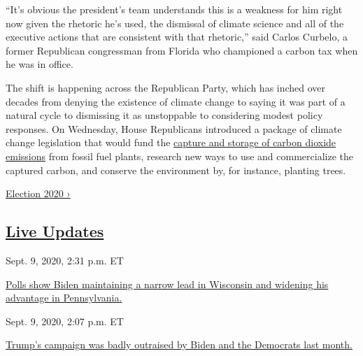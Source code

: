 ``It's obvious the president's team understands this is a weakness for
him right now given the rhetoric he's used, the dismissal of climate
science and all of the executive actions that are consistent with that
rhetoric,'' said Carlos Curbelo, a former Republican congressman from
Florida who championed a carbon tax when he was in office.

The shift is happening across the Republican Party, which has inched
over decades from denying the existence of climate change to saying it
was part of a natural cycle to dismissing it as unstoppable to
considering modest policy responses. On Wednesday, House Republicans
introduced a package of climate change legislation that would fund the
\href{https://www.nytimes3xbfgragh.onion/2020/02/11/climate/carbon-capture-tax.html}{capture
and storage of carbon dioxide emissions} from fossil fuel plants,
research new ways to use and commercialize the captured carbon, and
conserve the environment by, for instance, planting trees.

\href{https://www.nytimes3xbfgragh.onion/news-event/2020-election}{Election
2020 ›}

\hypertarget{live-updates}{%
\subsection{\texorpdfstring{\href{https://www.nytimes3xbfgragh.onion/live/2020/09/09/us/trump-vs-biden}{Live
Updates}}{Live Updates}}\label{live-updates}}

\href{https://www.nytimes3xbfgragh.onion/live/2020/09/09/us/trump-vs-biden\#polls-show-biden-maintaining-a-narrow-lead-in-wisconsin-and-widening-his-advantage-in-pennsylvania}{}

Sept. 9, 2020, 2:31 p.m. ET

\href{https://www.nytimes3xbfgragh.onion/live/2020/09/09/us/trump-vs-biden\#polls-show-biden-maintaining-a-narrow-lead-in-wisconsin-and-widening-his-advantage-in-pennsylvania}{Polls
show Biden maintaining a narrow lead in Wisconsin and widening his
advantage in
Pennsylvania.}\href{https://www.nytimes3xbfgragh.onion/live/2020/09/09/us/trump-vs-biden\#trumps-campaign-was-badly-outraised-by-biden-and-the-democrats-last-month}{}

Sept. 9, 2020, 2:07 p.m. ET

\href{https://www.nytimes3xbfgragh.onion/live/2020/09/09/us/trump-vs-biden\#trumps-campaign-was-badly-outraised-by-biden-and-the-democrats-last-month}{Trump's
campaign was badly outraised by Biden and the Democrats last
month.}\href{https://www.nytimes3xbfgragh.onion/live/2020/09/09/us/trump-vs-biden\#a-new-poll-shows-most-voters-think-trump-did-a-bad-job-on-the-virus-and-doubt-he-can-help-the-country-recover}{}

